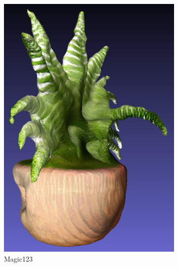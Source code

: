 \begin{figure}[ht]
\begin{subfigure}[b]{0.2\textwidth}
        \includegraphics[width=\textwidth]{etc/a high-quality rendering of a fern in a wooden pot/magic123/magic123_fern_side_result.png}
        \caption{Magic123}
    \end{subfigure}
    \begin{subfigure}[b]{0.32\textwidth}
        \centering

\end{subfigure}
\end{figure}
